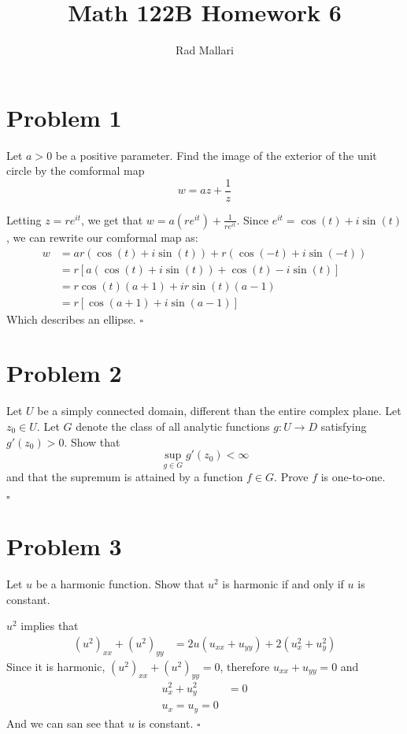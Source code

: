 \documentclass[11pt]{article}
\title{Math 122B Homework 6}
\author{Rad Mallari}
\newenvironment{proof}{\noindent{\bf Proof.}}{\hfill $\square$\medskip}
\begin{document}
\maketitle

\section{Problem 1}
Let $a>0$ be a positive parameter. Find the image of the exterior of the unit circle by the comformal map
$$w=az+\frac{1}{z}$$

\begin{proof}
Letting $z=re^{it}$, we get that $w=a(re^{it})+\frac{1}{re^{it}}$. Since $e^{it}=\cos(t)+i\sin(t)$, we can rewrite our comformal map as:
\begin{equation}
    \begin{split}
        w&=ar(\cos(t)+i\sin(t))+r(\cos(-t)+i\sin(-t))\\
        &=r\left[a(\cos(t)+i\sin(t))+\cos(t)-i\sin(t)\right]\\
        &=r\cos(t)(a+1)+ir\sin(t)(a-1)\\
        &=r\left[\cos(a+1)+i\sin(a-1)\right]
    \end{split}
\end{equation}
Which describes an ellipse.
\end{proof}


\section{Problem 2}
Let $U$ be a simply connected domain, different than the entire complex plane. Let $z_{0}\in U$. Let $G$ denote the class of all analytic functions $g:U\to D$ satisfying $g'(z_{0})>0$. Show that
$$\sup_{g\in G}g'(z_{0})<\infty$$
and that the supremum is attained by a function $f\in G$. Prove $f$ is one-to-one.

\begin{proof}
    
\end{proof}


\section{Problem 3}
Let $u$ be a harmonic function. Show that $u^{2}$ is harmonic if and only if $u$ is constant.

\begin{proof}
$u^{2}$ implies that 
\begin{equation}
    \begin{split}
        (u^{2})_{xx}+(u^{2})_{yy}&=2u(u_{xx}+u_{yy})+2(u^{2}_{x}+u^{2}_{y})
    \end{split}
\end{equation}
Since it is harmonic, $(u^{2})_{xx}+(u^{2})_{yy}=0$, therefore $u_{xx}+u_{yy}=0$ and
\begin{equation}
    \begin{split}
        u^{2}_{x}+u^{2}_{y}&=0\\
        u_{x}=u_{y}=0
    \end{split}
\end{equation}
And we can san see that $u$ is constant.
\end{proof}
\end{document}
